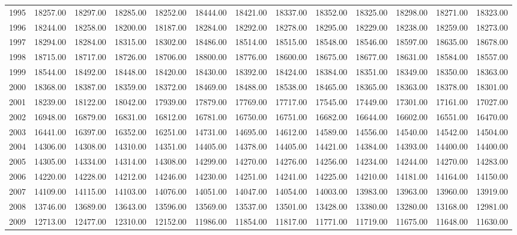 \begin{longtable}{rrrrrrrrrrrrr}
  1995 & 18257.00 & 18297.00 & 18285.00 & 18252.00 & 18444.00 & 18421.00 & 18337.00 & 18352.00 & 18325.00 & 18298.00 & 18271.00 & 18323.00 \\ 
  1996 & 18244.00 & 18258.00 & 18200.00 & 18187.00 & 18284.00 & 18292.00 & 18278.00 & 18295.00 & 18229.00 & 18238.00 & 18259.00 & 18273.00 \\ 
  1997 & 18294.00 & 18284.00 & 18315.00 & 18302.00 & 18486.00 & 18514.00 & 18515.00 & 18548.00 & 18546.00 & 18597.00 & 18635.00 & 18678.00 \\ 
  1998 & 18715.00 & 18717.00 & 18726.00 & 18706.00 & 18800.00 & 18776.00 & 18600.00 & 18675.00 & 18677.00 & 18631.00 & 18584.00 & 18557.00 \\ 
  1999 & 18544.00 & 18492.00 & 18448.00 & 18420.00 & 18430.00 & 18392.00 & 18424.00 & 18384.00 & 18351.00 & 18349.00 & 18350.00 & 18363.00 \\ 
  2000 & 18368.00 & 18387.00 & 18359.00 & 18372.00 & 18469.00 & 18488.00 & 18538.00 & 18465.00 & 18365.00 & 18363.00 & 18378.00 & 18301.00 \\ 
  2001 & 18239.00 & 18122.00 & 18042.00 & 17939.00 & 17879.00 & 17769.00 & 17717.00 & 17545.00 & 17449.00 & 17301.00 & 17161.00 & 17027.00 \\ 
  2002 & 16948.00 & 16879.00 & 16831.00 & 16812.00 & 16781.00 & 16750.00 & 16751.00 & 16682.00 & 16644.00 & 16602.00 & 16551.00 & 16470.00 \\ 
  2003 & 16441.00 & 16397.00 & 16352.00 & 16251.00 & 14731.00 & 14695.00 & 14612.00 & 14589.00 & 14556.00 & 14540.00 & 14542.00 & 14504.00 \\ 
  2004 & 14306.00 & 14308.00 & 14310.00 & 14351.00 & 14405.00 & 14378.00 & 14405.00 & 14421.00 & 14384.00 & 14393.00 & 14400.00 & 14400.00 \\ 
  2005 & 14305.00 & 14334.00 & 14314.00 & 14308.00 & 14299.00 & 14270.00 & 14276.00 & 14256.00 & 14234.00 & 14244.00 & 14270.00 & 14283.00 \\ 
  2006 & 14220.00 & 14228.00 & 14212.00 & 14246.00 & 14230.00 & 14251.00 & 14241.00 & 14225.00 & 14210.00 & 14181.00 & 14164.00 & 14150.00 \\ 
  2007 & 14109.00 & 14115.00 & 14103.00 & 14076.00 & 14051.00 & 14047.00 & 14054.00 & 14003.00 & 13983.00 & 13963.00 & 13960.00 & 13919.00 \\ 
  2008 & 13746.00 & 13689.00 & 13643.00 & 13596.00 & 13569.00 & 13537.00 & 13501.00 & 13428.00 & 13380.00 & 13280.00 & 13168.00 & 12981.00 \\ 
  2009 & 12713.00 & 12477.00 & 12310.00 & 12152.00 & 11986.00 & 11854.00 & 11817.00 & 11771.00 & 11719.00 & 11675.00 & 11648.00 & 11630.00 \\ 

\end{longtable}
